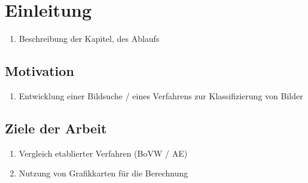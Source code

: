 \chapter{Einleitung}

\begin{enumerate}
	\item Beschreibung der Kapitel, des Ablaufs
\end{enumerate}

\section{Motivation}

\begin{enumerate}
	\item Entwicklung einer Bildsuche / eines Verfahrens zur Klassifizierung von Bilder

\end{enumerate}

\section{Ziele der Arbeit}

\begin{enumerate}
	\item Vergleich etablierter Verfahren (BoVW / AE)
	\item Nutzung von Grafikkarten für die Berechnung
\end{enumerate}